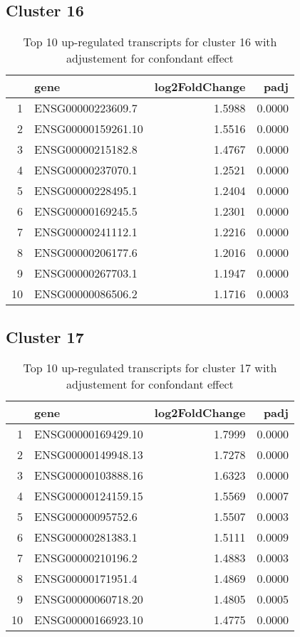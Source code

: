 \documentclass{article}
\begin{document}
\subsection{Cluster 16 }
\begin{table}[H]
\centering
\begin{tabularx}{\textwidth}{rlrr}
  \hline
 & gene & log2FoldChange & padj \\ 
  \hline
1 & ENSG00000223609.7 & 1.5988 & 0.0000 \\ 
  2 & ENSG00000159261.10 & 1.5516 & 0.0000 \\ 
  3 & ENSG00000215182.8 & 1.4767 & 0.0000 \\ 
  4 & ENSG00000237070.1 & 1.2521 & 0.0000 \\ 
  5 & ENSG00000228495.1 & 1.2404 & 0.0000 \\ 
  6 & ENSG00000169245.5 & 1.2301 & 0.0000 \\ 
  7 & ENSG00000241112.1 & 1.2216 & 0.0000 \\ 
  8 & ENSG00000206177.6 & 1.2016 & 0.0000 \\ 
  9 & ENSG00000267703.1 & 1.1947 & 0.0000 \\ 
  10 & ENSG00000086506.2 & 1.1716 & 0.0003 \\ 
   \hline
\end{tabularx}
\caption{Top 10 up-regulated transcripts for cluster 16 with adjustement for confondant effect} 
\label{tab:q3_1_conf_16}
\end{table}
\subsection{Cluster 17 }
\begin{table}[H]
\centering
\begin{tabularx}{\textwidth}{rlrr}
  \hline
 & gene & log2FoldChange & padj \\ 
  \hline
1 & ENSG00000169429.10 & 1.7999 & 0.0000 \\ 
  2 & ENSG00000149948.13 & 1.7278 & 0.0000 \\ 
  3 & ENSG00000103888.16 & 1.6323 & 0.0000 \\ 
  4 & ENSG00000124159.15 & 1.5569 & 0.0007 \\ 
  5 & ENSG00000095752.6 & 1.5507 & 0.0003 \\ 
  6 & ENSG00000281383.1 & 1.5111 & 0.0009 \\ 
  7 & ENSG00000210196.2 & 1.4883 & 0.0003 \\ 
  8 & ENSG00000171951.4 & 1.4869 & 0.0000 \\ 
  9 & ENSG00000060718.20 & 1.4805 & 0.0005 \\ 
  10 & ENSG00000166923.10 & 1.4775 & 0.0000 \\ 
   \hline
\end{tabularx}
\caption{Top 10 up-regulated transcripts for cluster 17 with adjustement for confondant effect} 
\label{tab:q3_1_conf_17}
\end{table}
\end{document}
